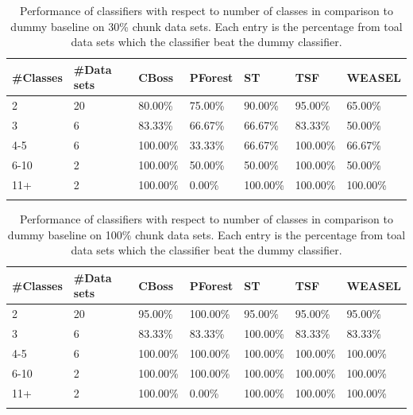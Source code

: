 \begin{table}[hp!]
	\setlength\extrarowheight{2pt} %
	\begin{tabularx}{\textwidth}{|X|X|X|X|X|X|X|}
	\hline
	\textbf{\#Classes} & \textbf{\#Data sets} & \textbf{CBoss} & \textbf{PForest} & \textbf{ST} & \textbf{TSF} & \textbf{WEASEL} \\ \hline
		2 & 20 & 80.00\% & 75.00\% & 90.00\% & 95.00\% & 65.00\% \\ \hline
		3 & 6 & 83.33\% & 66.67\% & 66.67\% & 83.33\% & 50.00\% \\ \hline
		4-5 & 6 & 100.00\% & 33.33\% & 66.67\% & 100.00\% & 66.67\% \\ \hline
		6-10 & 2 & 100.00\% & 50.00\% & 50.00\% & 100.00\% & 50.00\% \\ \hline
		11+ & 2 & 100.00\% & 0.00\% & 100.00\% & 100.00\% & 100.00\% \\ \hline
  \caption{Performance of classifiers with respect to number of classes in comparison to dummy baseline on 30\% chunk data sets. Each entry is the percentage from toal data sets which the classifier beat the dummy classifier.}
  \label{TableNumClass30}
  \end{tabularx}
\end{table}

\begin{table}[hp!]
	\setlength\extrarowheight{2pt} %
	\begin{tabularx}{\textwidth}{|X|X|X|X|X|X|X|}
	\hline
	\textbf{\#Classes} & \textbf{\#Data sets} & \textbf{CBoss} & \textbf{PForest} & \textbf{ST} & \textbf{TSF} & \textbf{WEASEL} \\ \hline
		2 & 20 & 95.00\% & 100.00\% & 95.00\% & 95.00\% & 95.00\% \\ \hline
		3 & 6 & 83.33\% & 83.33\% & 100.00\% & 83.33\% & 83.33\% \\ \hline
		4-5 & 6 & 100.00\% & 100.00\% & 100.00\% & 100.00\% & 100.00\% \\ \hline
		6-10 & 2 & 100.00\% & 100.00\% & 100.00\% & 100.00\% & 100.00\% \\ \hline
		11+ & 2 & 100.00\% & 0.00\% & 100.00\% & 100.00\% & 100.00\% \\ \hline
  \caption{Performance of classifiers with respect to number of classes in comparison to dummy baseline on 100\% chunk data sets. Each entry is the percentage from toal data sets which the classifier beat the dummy classifier.}
  \label{TableNumClass100}
  \end{tabularx}
\end{table}

